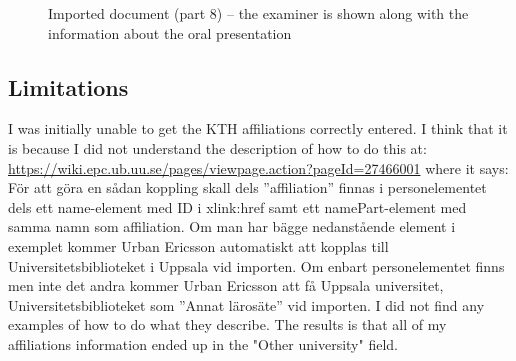 \begin{figure}[!ht]
  \begin{center}
  \end{center}
  \caption[Imported document (part 8)]{Imported document (part 8) – the examiner is shown along with the information about the oral presentation}
  \label{fig:divaImport12}
\end{figure}
\clearpage


	

\subsection{Limitations}
I was initially unable to get the KTH affiliations correctly entered. I think that it is because I did not understand the description of how to do this at: \url{ https://wiki.epc.ub.uu.se/pages/viewpage.action?pageId=27466001}  where it says:
För att göra en sådan koppling skall dels ”affiliation” finnas i personelementet dels ett name-element med ID i xlink:href samt ett namePart-element med samma namn som affiliation. Om man har bägge nedanstående element i exemplet kommer Urban Ericsson automatiskt att kopplas till Universitetsbiblioteket i Uppsala vid importen. Om enbart personelementet finns men inte det andra kommer Urban Ericsson att få Uppsala universitet, Universitetsbiblioteket som ”Annat lärosäte” vid importen.
I did not find any examples of how to do what they describe. The results is that all of my affiliations information ended up in the "Other university" field.

